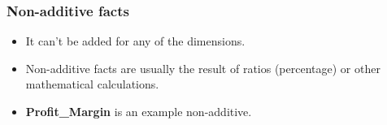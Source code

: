 \begin{frame}
    \frametitle{Non-additive facts}
    
    \begin{itemize}
        \item It can't be added for any of the dimensions.
        \item Non-additive facts are usually the result of ratios (percentage) or other mathematical calculations.
        \item \textbf{Profit\_Margin} is an example non-additive.
    \end{itemize}

    \vspace{1cm}
    \centering
    

\end{frame}


